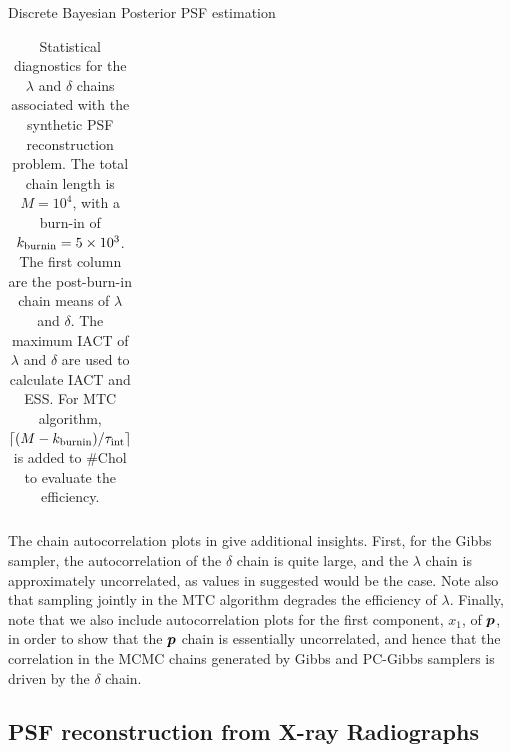 \begin{chapter}{Discrete Bayesian Posterior PSF estimation}
\begin{table}[h]
\begin{center}
\begin{tabular}{l|ccccccc}
    \hline
  \end{tabular}
  \caption{ Statistical diagnostics for the $\lambda$ and $\delta$ chains associated with the synthetic PSF reconstruction problem. The total chain length is $M=10^4$, with a burn-in of $k_{\rm burnin} = 5\times10^3$. The first column are the post-burn-in chain means of $\lambda$ and $\delta$. The maximum IACT of $\lambda$ and $\delta$ are used to calculate IACT and ESS. For MTC algorithm, $\lceil(M-k_{\rm burnin})/\tau_{\rm int}\rceil$ is added to \#Chol to evaluate the efficiency.} \label{tab:PSFDeltaChain}
\end{center}
\end{table}

The chain autocorrelation plots in  give additional insights. 
First, for the Gibbs sampler, the autocorrelation of the $\delta$ chain is quite large, and the $\lambda$ chain is approximately uncorrelated, as values in  suggested would be the case. 
Note also that sampling jointly in the MTC algorithm degrades the efficiency of $\lambda$. 
Finally, note that we also include autocorrelation plots for the first component, $x_1$, of $\mbox{\boldmath$p$}$, in order to show that the $\mbox{\boldmath$p$}$ chain is essentially uncorrelated, and hence that the correlation in the MCMC chains generated by Gibbs and PC-Gibbs samplers is driven by the $\delta$ chain. 

\subsection{PSF reconstruction from X-ray Radiographs}\label{subsec:real data}



\end{chapter}
